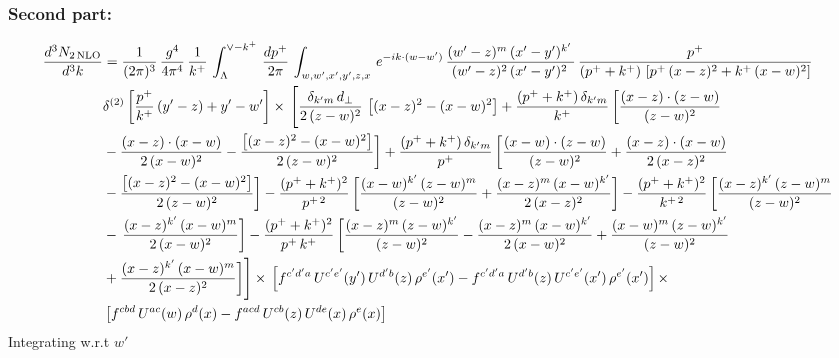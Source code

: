\documentclass[9pt]{article}
\numberwithin{equation}{section}
\begin{document}
\subsubsection{Second part:\,}
\begin{align}
    \frac{d^{3}N_{2\,\rm NLO}}{d^{3}k} & =  \frac{1}{(2\pi)^{3}}\,\frac{g^{4}}{4\pi^{4}}\, \frac{1}{k^{+}}\,\int_{\Lambda}^{\vee-k^{+}}\, \frac{dp^{+}}{2\pi}\, \int_{w,w',x',y',z,x}\, e^{-ik\cdot (w-w')}\, \frac{(w'-z)^{m}\,(x'-y')^{k'}\,}{(w'-z)^{2}\,(x'-y')^{2}\,}\, \frac{p^{+}}{(p^{+}+k^{+})\,\left[p^{+}\,(x-z)^{2}+k^{+}\,(x-w)^{2}\right]}\notag \\ & \delta^{(2)}\left[\frac{p^{+}}{k^{+}}\, (y'-z)+y'-w'\right]\times\, \Bigg[\frac{\delta_{k'm}\,d_{\perp}}{2\,(z-w)^{2}}\, \left[(x-z)^{2}-(x-w)^{2}\right]+\frac{(p^{+}+k^{+})\,\delta_{k'm}}{k^{+}}\,\bigg[\frac{(x-z)\cdot (z-w)}{(z-w)^{2}}\notag \\ & -\frac{(x-z)\cdot (x-w)}{2\,(x-w)^{2}}-\frac{\left[(x-z)^{2}-(x-w)^{2}\right]}{2\,(z-w)^{2}}\bigg]+\frac{(p^{+}+k^{+})\,\delta_{k'm}}{p^{+}}\,\bigg[\frac{(x-w)\cdot (z-w)}{(z-w)^{2}}+\frac{(x-z)\cdot (x-w)}{2\,(x-z)^{2}}\notag \\ & -\frac{\left[(x-z)^{2}-(x-w)^{2}\right]}{2\,(z-w)^{2}}\bigg]-\frac{(p^{+}+k^{+})^{2}}{p^{+\,2}}\,\bigg[\frac{(x-w)^{k'}\,(z-w)^{m}}{(z-w)^{2}}+\frac{(x-z)^{m}\,(x-w)^{k'}}{2\,(x-z)^{2}}\bigg]-\frac{(p^{+}+k^{+})^{2}}{k^{+\,2}}\,\bigg[\frac{(x-z)^{k'}\,(z-w)^{m}}{(z-w)^{2}}\notag \\ & -\,\frac{(x-z)^{k'}\,(x-w)^{m}}{2\,(x-w)^{2}}\bigg]-\frac{(p^{+}+k^{+})^{2}}{p^{+}\,k^{+}}\,\bigg[\frac{(x-z)^{m}\,(z-w)^{k'}}{(z-w)^{2}}-\frac{(x-z)^{m}\,(x-w)^{k'}}{2\,(x-w)^{2}}+\frac{(x-w)^{m}\,(z-w)^{k'}}{(z-w)^{2}}\notag \\ & +\frac{(x-z)^{k'}\,(x-w)^{m}}{2\,(x-z)^{2}}\bigg]\Bigg]\times\,\left[f^{c'd'a}\,U^{c'e'}(y')\,U^{d'b}(z)\,\rho^{e'}(x')-f^{c'd'a}\, 
    U^{d'b}(z)\,U^{c'e'}(x')\,\rho^{e'}(x')\right]\times \notag \\ & \left[f^{cbd}\,U^{ac}(w)\,\rho^{d}(x) -f^{acd}\,U^{cb}(z)\,U^{de}(x)\,\rho^{e}(x)\right]
\end{align}
Integrating w.r.t $w'$
\end{document}
